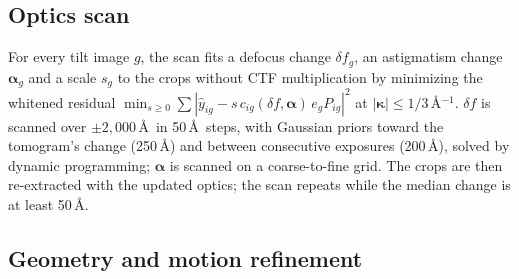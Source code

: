 \subsection{Optics scan}
\label{sec:suppl:method:optics}

For every tilt image $g$, the scan fits a defocus change $\delta f_g$, an astigmatism change $\bm{\alpha}_g$ and a scale $s_g$ to the crops without CTF multiplication by minimizing the whitened residual $\min_{s\ge0}\sum|\hat{y}_{ig}-s\,c_{ig}(\delta f,\bm{\alpha})\,e_gP_{ig}|^2$ at $|\bm{\kappa}|\le1/3$\,\AA$^{-1}$.
$\delta f$ is scanned over $\pm2{,}000$\,\AA\ in 50\,\AA\ steps, with Gaussian priors toward the tomogram's change (250\,\AA) and between consecutive exposures (200\,\AA), solved by dynamic programming; $\bm{\alpha}$ is scanned on a coarse-to-fine grid.
The crops are then re-extracted with the updated optics; the scan repeats while the median change is at least 50\,\AA.

\subsection{Geometry and motion refinement}
\label{sec:suppl:method:p1}

